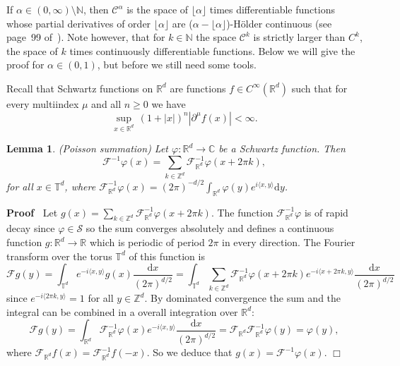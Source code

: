 \documentclass[a4paper,11pt]{article}
\newcommand{\mathd}{\mathrm{d}}
\newenvironment{proof}{\noindent\textbf{Proof\ }}{\hspace*{\fill}$\Box$\medskip}
\newtheorem{lemma}{Lemma}
{\theorembodyfont{\rmfamily}\newtheorem{remark}{Remark}}
\newcommand{\CF}{\mathscr{F}}
\newcommand{\CS}{\mathscr{S}}
\newcommand{\CC}{\mathscr{C}}
\begin{document}
If $\alpha \in (0, \infty) \setminus \mathbb{N}$, then $\CC^{\alpha}$ is the
space of $\lfloor \alpha \rfloor$ times differentiable functions whose partial
derivatives of order $\lfloor \alpha \rfloor$ are ($\alpha - \lfloor \alpha
\rfloor$)-H{\"o}lder continuous (see page~99 of~{\cite{Bahouri2011}}). Note
however, that for $k \in \mathbb{N}$ the space $\CC^k$ is strictly larger
than $C^k$, the space of $k$ times continuously differentiable functions.
Below we will give the proof for $\alpha \in (0, 1)$, but before we still need
some tools.

Recall that Schwartz functions on $\mathbb{R}^d$ are functions $f\in C^\infty(\mathbb{R}^d)$ such that for every multiindex $\mu$ and all $n\ge 0$ we have
\[
\sup_{x\in\mathbb{R}^d}\, (1+|x|)^n |\partial^\mu f(x)| < \infty.
\]
\begin{lemma}
  \label{lem:poisson}(Poisson summation) Let $\varphi : \mathbb{R}^d
  \rightarrow \mathbb{C}$ be a Schwartz function. Then
  \[ \CF^{- 1} \varphi (x) = \sum_{k \in \mathbb{Z}^d} \CF^{-
     1}_{\mathbb{R}^d} \varphi (x + 2 \pi k), \]
  for all $x \in \mathbb{T}^d$, where $\CF^{- 1}_{\mathbb{R}^d} \varphi (x)
  = (2 \pi)^{- d / 2} \int_{\mathbb{R}^d} \varphi (y) e^{i \langle x, y
  \rangle} \mathd y$.
\end{lemma}

\begin{proof}
  Let $g (x) = \sum_{k \in \mathbb{Z}^d} \CF^{- 1}_{\mathbb{R}^d} \varphi (x
  + 2 \pi k)$. The function $\CF^{- 1}_{\mathbb{R}^d} \varphi$ is of rapid
  decay since $\varphi \in \CS$ so the sum converges absolutely and defines a
  continuous function $g : \mathbb{R}^d \rightarrow \mathbb{R}$ which is
  periodic of period $2 \pi$ in every direction. The Fourier transform over
  the torus $\mathbb{T}^d$ of this function is
  \[ \CF g (y) = \int_{\mathbb{T}^d} e^{- i \langle x, y \rangle} g (x)
     \frac{\mathd x}{(2 \pi)^{d / 2}} = \int_{\mathbb{T}^d} \sum_{k \in
     \mathbb{Z}^d} \CF^{- 1}_{\mathbb{R}^d} \varphi (x + 2 \pi k) e^{- i
     \langle x + 2 \pi k, y \rangle} \frac{\mathd x}{(2 \pi)^{d / 2}} \]
  since $e^{- i \langle 2 \pi k, y \rangle} = 1$ for all $y \in \mathbb{Z}^d$. By dominated convergence the
  sum and the integral can be combined in a overall integration over
  $\mathbb{R}^d$:
  \[ \CF g (y) = \int_{\mathbb{R}^d} \CF^{- 1}_{\mathbb{R}^d} \varphi (x)
     e^{- i \langle x, y \rangle} \frac{\mathd x}{(2 \pi)^{d / 2}} =
     \CF_{\mathbb{R}^d} \CF^{- 1}_{\mathbb{R}^d} \varphi (y) = \varphi (y),
  \]
  where $\CF_{\mathbb{R}^d} f (x) = \CF_{\mathbb{R}^d}^{-1} f (-x)$. So we deduce that $g (x) = \CF^{- 1} \varphi (x)$.
\end{proof}
\end{document}
